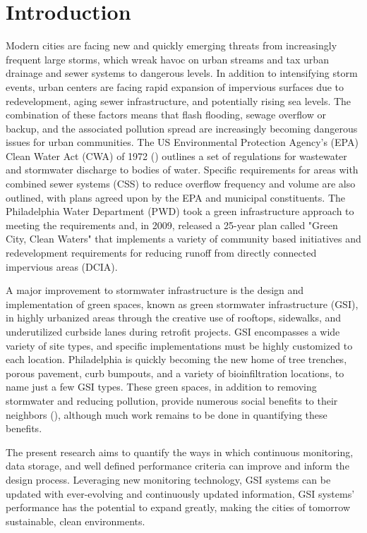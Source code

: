 %
\chapter{Introduction}

Modern cities are facing new and quickly emerging threats from increasingly frequent large storms, which wreak havoc on urban streams and tax urban drainage and sewer systems to dangerous levels. 
In addition to intensifying storm events, urban centers are facing rapid expansion of impervious surfaces due to redevelopment, aging sewer infrastructure, and potentially rising sea levels.
The combination of these factors means that flash flooding, sewage overflow or backup, and the associated pollution spread are increasingly becoming dangerous issues for urban communities.
The US Environmental Protection Agency's (EPA) Clean Water Act (CWA) of 1972 (\cite{USEPA2009}) outlines a set of regulations for wastewater and stormwater discharge to bodies of water.
Specific requirements for areas with combined sewer systems (CSS) to reduce overflow frequency and volume are also outlined, with plans agreed upon by the EPA and municipal constituents.
The Philadelphia Water Department (PWD) took a green infrastructure approach to meeting the requirements and, in 2009, released a 25-year plan called "Green City, Clean Waters" that implements a variety of community based initiatives and redevelopment requirements for reducing runoff from directly connected impervious areas (DCIA).

A major improvement to stormwater infrastructure is the design and implementation of green spaces, known as green stormwater infrastructure (GSI), in highly urbanized areas through the creative use of rooftops, sidewalks, and underutilized curbside lanes during retrofit projects.
GSI encompasses a wide variety of site types, and specific implementations must be highly customized to each location.
Philadelphia is quickly becoming the new home of tree trenches, porous pavement, curb bumpouts, and a variety of bioinfiltration locations, to name just a few GSI types.
These green spaces, in addition to removing stormwater and reducing pollution, provide numerous social benefits to their neighbors (\cite{Callahan2019,Taguchi2020}), although much work remains to be done in quantifying these benefits.

The present research aims to quantify the ways in which continuous monitoring, data storage, and well defined performance criteria can improve and inform the design process.
Leveraging new monitoring technology, GSI systems can be updated with ever-evolving and continuously updated information, GSI systems' performance has the potential to expand greatly, making the cities of tomorrow sustainable, clean environments.


